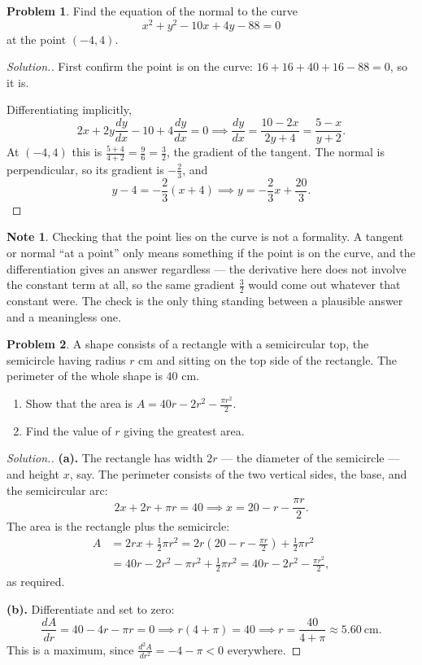 \documentclass[11pt,a4paper]{article}
\theoremstyle{definition}
\newtheorem{note}[thm]{Note}
\newtheorem{problemx}{Problem}[section]
\newenvironment{problem}{\begin{problemx}}{\end{problemx}}
\newenvironment{solution}
  {\renewcommand{\qedsymbol}{}\begin{proof}[\textit{Solution}.]}
  {\end{proof}}
\begin{document}
\begin{problem}
Find the equation of the normal to the curve
$$x^{2}+y^{2}-10x+4y-88=0$$
at the point $(-4,4)$.
\end{problem}

\begin{solution}
First confirm the point is on the curve:
$16+16+40+16-88=0$, so it is.

Differentiating implicitly,
$$2x+2y\frac{dy}{dx}-10+4\frac{dy}{dx}=0
\implies \frac{dy}{dx}=\frac{10-2x}{2y+4}=\frac{5-x}{y+2}.$$
At $(-4,4)$ this is $\frac{5+4}{4+2}=\frac{9}{6}=\frac{3}{2}$, the gradient of
the tangent. The normal is perpendicular, so its gradient is
$-\frac{2}{3}$, and
$$y-4=-\frac{2}{3}(x+4) \implies y=-\frac{2}{3}x+\frac{20}{3}.$$
\end{solution}

\begin{note}
Checking that the point lies on the curve is not a formality. A tangent or normal
``at a point'' only means something if the point is on the curve, and the
differentiation gives an answer regardless --- the derivative here does not involve
the constant term at all, so the same gradient $\frac{3}{2}$ would come out whatever
that constant were. The check is the only thing standing between a plausible
answer and a meaningless one.
\end{note}

\begin{problem}
A shape consists of a rectangle with a semicircular top, the semicircle having
radius $r$ cm and sitting on the top side of the rectangle. The perimeter of the
whole shape is $40$ cm.
\begin{enumerate}
\item[(a).] Show that the area is $A=40r-2r^{2}-\frac{\pi r^{2}}{2}$.
\item[(b).] Find the value of $r$ giving the greatest area.
\end{enumerate}
\end{problem}

\begin{solution}
\textbf{(a).} The rectangle has width $2r$ --- the diameter of the semicircle --- and
height $x$, say. The perimeter consists of the two vertical sides, the base, and
the semicircular arc:
$$2x+2r+\pi r=40 \implies x=20-r-\frac{\pi r}{2}.$$
The area is the rectangle plus the semicircle:
\begin{align*}
A&=2rx+\frac{1}{2}\pi r^{2}
  =2r\left(20-r-\frac{\pi r}{2}\right)+\frac{1}{2}\pi r^{2}\\
 &=40r-2r^{2}-\pi r^{2}+\frac{1}{2}\pi r^{2}
  =40r-2r^{2}-\frac{\pi r^{2}}{2},
\end{align*}
as required.

\textbf{(b).} Differentiate and set to zero:
$$\frac{dA}{dr}=40-4r-\pi r=0 \implies r(4+\pi)=40 \implies r=\frac{40}{4+\pi}
\approx 5.60\ \text{cm}.$$
This is a maximum, since $\frac{d^{2}A}{dr^{2}}=-4-\pi<0$ everywhere.
\end{solution}
\end{document}
